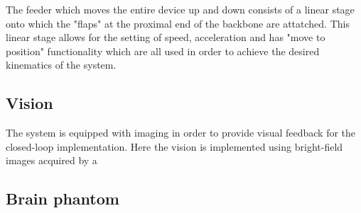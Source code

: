 The feeder which moves the entire device up and down consists of a linear stage  onto which the "flaps" at the proximal end of the backbone are attatched. This linear stage allows for the setting of speed, acceleration and has "move to position" functionality which are all used in order to achieve the desired kinematics of the system.


\subsection{Vision}
The system is equipped with imaging in order to provide visual feedback for the closed-loop implementation. Here the vision is implemented using bright-field images acquired by a 

\subsection{Brain phantom}
